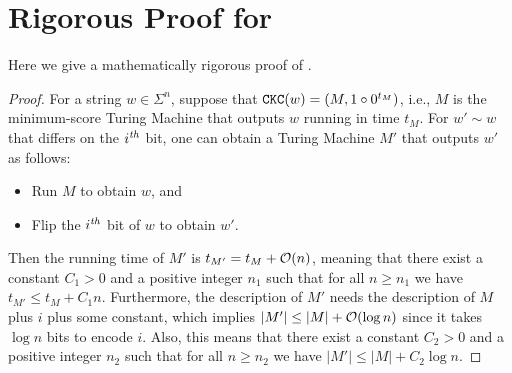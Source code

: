 \allowdisplaybreaks
\section{Rigorous Proof for }

Here we give a mathematically rigorous proof of .

\begin{remindertheorem}{}
\kolcomp
\end{remindertheorem}

\begin{proof}
    For a string $w\in\Sigma^n$, suppose that $\mathtt{CKC}(w)=(M,1\circ0^{t_M})$, i.e., $M$ is the minimum-score Turing Machine that outputs $w$ running in time $t_M$. For $w'\sim w$ that differs on the $i^{\mbox{\scriptsize{\textit{th}}}}$ bit, one can obtain a Turing Machine $M'$ that outputs $w'$ as follows:
    \begin{itemize}
        \item Run $M$ to obtain $w$, and
        \item Flip the $i^{\mbox{\scriptsize{\textit{th}}}}$ bit of $w$ to obtain $w'$.
    \end{itemize}
    Then the running time of $M'$ is $t_{M'}=t_M+\O{n}$, meaning that there exist a constant $C_1>0$ and a positive integer $n_1$ such that for all $n\geq n_1$ we have $t_{M'}\leq t_M+C_1n$. Furthermore, the description of $M'$ needs the description of $M$ plus $i$ plus some constant, which implies $|M'|\leq|M|+\O{\log n}$ since it takes $\log n$ bits to encode $i$. Also, this means that there exist a constant $C_2>0$ and a positive integer $n_2$ such that for all $n\geq n_2$ we have $|M'|\leq |M|+C_2\log n$.


\end{proof}
